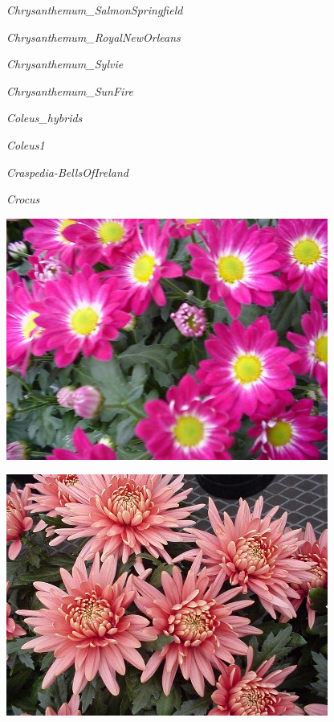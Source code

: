 \documentclass{article}
\begin{document}
\noindent   
\vfill
\centerline{{\Large\emph{Chrysanthemum_SalmonSpringfield}}}
\vfill
\newpage

\noindent   
\vfill
\centerline{{\Large\emph{Chrysanthemum_RoyalNewOrleans}}}
\vfill
\newpage

\noindent   
\vfill
\centerline{{\Large\emph{Chrysanthemum_Sylvie}}}
\vfill
\newpage

\noindent   
\vfill
\centerline{{\Large\emph{Chrysanthemum_SunFire}}}
\vfill
\newpage

\noindent   
\vfill
\centerline{{\Large\emph{Coleus_hybrids}}}
\vfill
\newpage

\noindent   
\vfill
\centerline{{\Large\emph{Coleus1}}}
\vfill
\newpage

\noindent   
\vfill
\centerline{{\Large\emph{Craspedia-BellsOfIreland}}}
\vfill
\newpage

\noindent   
\vfill
\centerline{{\Large\emph{Crocus}}}
\vfill
\newpage

\begin{center}
\includegraphics[width=0.9\textheight, angle=90]{../Chrysanthemum_RoyalNewOrleans.jpg}
\end{center}
\newpage

\begin{center}
\includegraphics[width=0.9\textheight, angle=90]{../Chrysanthemum_SalmonSpringfield.jpg}
\end{center}
\newpage
\end{document}
